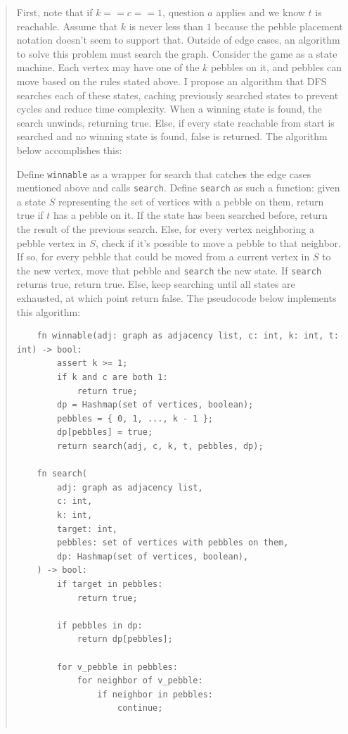 \documentclass[11pt]{article}
\begin{document}
\begin{enumerate}
\begin{enumerate}
\begin{quote}
      \medskip
      First, note that if $k == c == 1$, question $a$ applies and we know $t$ is reachable. Assume that $k$ is never less than $1$ because the pebble placement notation doesn't seem to support that. Outside of edge cases, an algorithm to solve this problem must search the graph. Consider the game as a state machine. Each vertex may have one of the $k$ pebbles on it, and pebbles can move based on the rules stated above. I propose an algorithm that DFS searches each of these states, caching previously searched states to prevent cycles and reduce time complexity. When a winning state is found, the search unwinds, returning true. Else, if every state reachable from start is searched and no winning state is found, false is returned. The algorithm below accomplishes this:

      \medskip
      Define \texttt{winnable} as a wrapper for search that catches the edge cases mentioned above and calls \texttt{search}. Define \texttt{search} as such a function: given a state $S$ representing the set of vertices with a pebble on them, return true if $t$ has a pebble on it. If the state has been searched before, return the result of the previous search. Else, for every vertex neighboring a pebble vertex in $S$, check if it's possible to move a pebble to that neighbor. If so, for every pebble that could be moved from a current vertex in $S$ to the new vertex, move that pebble and \texttt{search} the new state. If \texttt{search} returns true, return true. Else, keep searching until all states are exhausted, at which point return false. The pseudocode below implements this algorithm: 
      \newpage

    \begin{verbatim}
    fn winnable(adj: graph as adjacency list, c: int, k: int, t: int) -> bool: 
        assert k >= 1;
        if k and c are both 1:
            return true;
        dp = Hashmap(set of vertices, boolean);
        pebbles = { 0, 1, ..., k - 1 };
        dp[pebbles] = true;
        return search(adj, c, k, t, pebbles, dp);

    fn search(
        adj: graph as adjacency list,
        c: int,
        k: int,
        target: int,
        pebbles: set of vertices with pebbles on them,
        dp: Hashmap(set of vertices, boolean),
    ) -> bool: 
        if target in pebbles:
            return true;
        
        if pebbles in dp:
            return dp[pebbles];

        for v_pebble in pebbles:
            for neighbor of v_pebble:
                if neighbor in pebbles:
                    continue;


\end{verbatim}
\end{quote}
\end{enumerate}
\end{enumerate}
\end{document}
